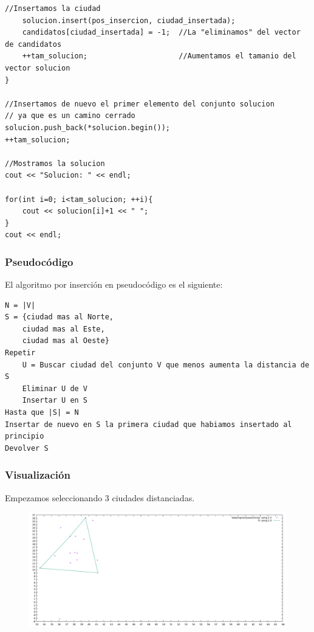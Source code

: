 \documentclass[11pt,a4paper]{article} %
\begin{document}
\begin{lstlisting}[style=C++]
	//Insertamos la ciudad
	solucion.insert(pos_insercion, ciudad_insertada);
	candidatos[ciudad_insertada] = -1;  //La "eliminamos" del vector de candidatos
	++tam_solucion;                     //Aumentamos el tamanio del vector solucion
}    

//Insertamos de nuevo el primer elemento del conjunto solucion
// ya que es un camino cerrado
solucion.push_back(*solucion.begin());
++tam_solucion;

//Mostramos la solucion
cout << "Solucion: " << endl;

for(int i=0; i<tam_solucion; ++i){
	cout << solucion[i]+1 << " ";
}
cout << endl;
\end{lstlisting}

\subsubsection{Pseudocódigo}
El algoritmo por inserción en pseudocódigo es el siguiente:
\begin{lstlisting}
N = |V|
S = {ciudad mas al Norte, 
	ciudad mas al Este, 
	ciudad mas al Oeste}
Repetir
	U = Buscar ciudad del conjunto V que menos aumenta la distancia de S
	Eliminar U de V
	Insertar U en S
Hasta que |S| = N
Insertar de nuevo en S la primera ciudad que habiamos insertado al principio
Devolver S
\end{lstlisting}

\subsubsection{Visualización}
Empezamos seleccionando 3 ciudades distanciadas.
\begin{figure}[H]
	\centering
	\includegraphics[width=13cm]{data/graphics/insercion/insercion_1.pdf}
\end{figure}
\vspace{0,7cm}
\end{document}
